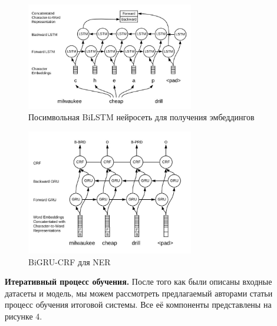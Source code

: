 \documentclass[12pt,a4paper]{article}
\begin{document}
\begin{figure}[H]
\begin{center}
  \includegraphics[width=0.65\textwidth]{pap_emb.jpg}
  \caption{Посимвольная BiLSTM нейросеть для получения эмбеддингов}
\end{center}
\end{figure}

\begin{figure}[H]
\begin{center}
  \includegraphics[width=0.65\textwidth]{pap_net.jpg}
  \caption{BiGRU-CRF для NER}
\end{center}
\end{figure}

\textbf{Итеративный процесс обучения.} После того как были описаны входные датасеты и модель, мы можем рассмотреть предлагаемый авторами статьи процесс обучения итоговой системы. Все её компоненты представлены на рисунке 4.
\end{document}
